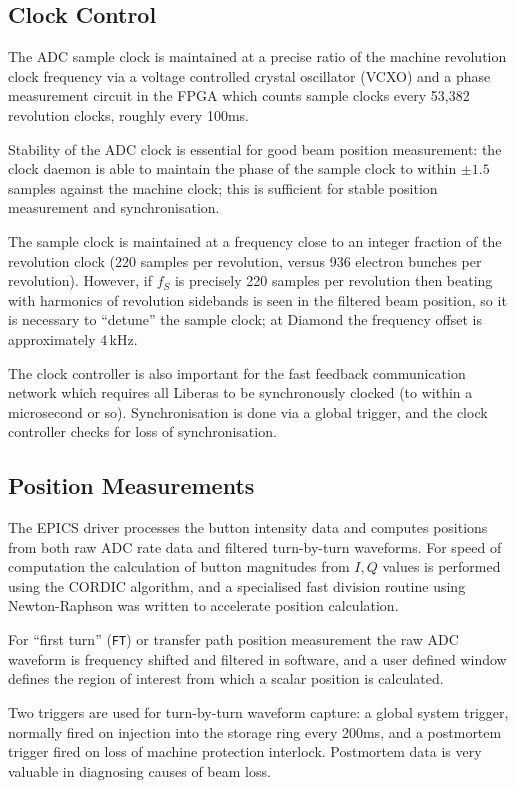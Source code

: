 \documentclass{JAC2003}
\begin{document}
\subsection{Clock Control}

The ADC sample clock is maintained at a precise ratio of the machine
revolution clock frequency via a voltage controlled crystal oscillator (VCXO)
and a phase measurement circuit in the FPGA which counts sample clocks every
53,382 revolution clocks, roughly every 100ms.  

Stability of the ADC clock is essential for good beam position measurement:
the clock daemon is able to maintain the phase of the sample clock to within
$\pm 1.5$ samples against the machine clock; this is sufficient for stable
position measurement and synchronisation.

The sample clock is maintained at a frequency close to an integer fraction of
the revolution clock (220 samples per revolution, versus 936 electron bunches
per revolution).  However, if $f_S$ is precisely 220 samples per revolution
then beating with harmonics of revolution sidebands is seen in the filtered
beam position, so it is necessary to ``detune'' the sample clock; at Diamond
the frequency offset is approximately 4\,kHz.

The clock controller is also important for the fast feedback communication
network which requires all Liberas to be synchronously clocked (to within a
microsecond or so).  Synchronisation is done via a global trigger, and the
clock controller checks for loss of synchronisation.


\subsection{Position Measurements}

The EPICS driver processes the button intensity data and computes positions
from both raw ADC rate data and filtered turn-by-turn waveforms.  For speed of
computation the calculation of button magnitudes from $I,Q$ values is
performed using the CORDIC\cite{cordic} algorithm, and a specialised fast
division routine using Newton-Raphson was written to accelerate position
calculation.

For ``first turn'' (\texttt{FT}) or transfer path position measurement the raw
ADC waveform is frequency shifted and filtered in software, and a user
defined window defines the region of interest from which a scalar position is
calculated.

Two triggers are used for turn-by-turn waveform capture: a global system
trigger, normally fired on injection into the storage ring every 200ms, and a
postmortem trigger fired on loss of machine protection interlock.  Postmortem
data is very valuable in diagnosing causes of beam loss.
\end{document}
